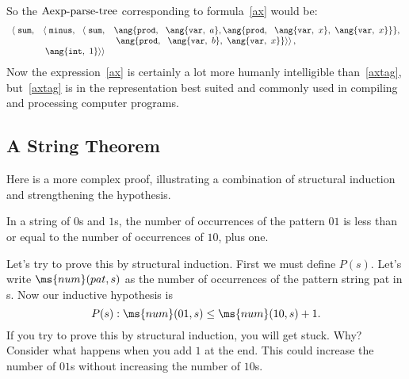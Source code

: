 \begin{definition}
\begin{staffnotes}
So the $\text{Aexp-parse-tree}$ corresponding to formula~\ref{ax} would be:
\begin{equation}\label{axtag}
\begin{array}{rll}
\left< \right. \texttt{sum}, 
         & \left< \right. \texttt{minus},\ \ \left< \right. \texttt{sum},
               & \ang{\texttt{prod},\ \ \ang{\texttt{var},\ a},
                                     \ang{\texttt{prod},\ \
                                            \ang{\texttt{var},\ x},\
                                            \ang{\texttt{var},\ x}}},\\
                               && \left. \left. \ang{\texttt{prod},\ \
                                       \ang{\texttt{var},\ b},\
                                       \ang{\texttt{var},\ x}}
                                   \right> \right>,\\
         & \left. \left. \ang{\texttt{int},\ 1} \right> \right>
\end{array}
\end{equation}
Now the expression~\ref{ax} is certainly a lot more humanly
intelligible than~\ref{axtag}, but~\ref{axtag} is in the
representation best suited and commonly used in compiling and
processing computer programs.

\end{staffnotes}


\begin{staffnotes}

\subsection{A String Theorem}

Here is a more complex proof, illustrating a combination of structural
induction and strengthening the hypothesis.

\begin{theorem}
  In a string of $0$s and $1$s, the number of occurrences of the pattern
  $01$ is less than or equal to the number of occurrences of $10$, plus
  one.
\end{theorem}

Let's try to prove this by structural induction.  First we must
define $P(s)$.  Let's write $\ms{num}(pat,s)$ as the number of
occurrences of the pattern string pat in s.  Now our inductive
hypothesis is
\[
P(s): \ms{num}(01,s) \leq \ms{num}(10,s) + 1. 
\]
If you try to prove this by structural induction, you will get
stuck.
Why? 
Consider what happens when you add $1$ at the end.  
This could increase the number of $01$s without increasing the number of
$10$s. 


\end{staffnotes}
\end{definition}
